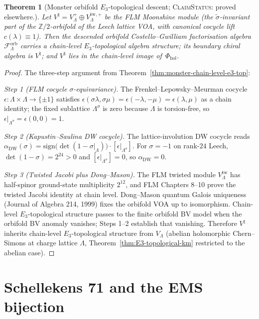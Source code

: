\documentclass[11pt]{amsart}
\newtheorem{theorem}{Theorem}[section]
\theoremstyle{definition}
\theoremstyle{remark}
\providecommand{\Z}{\mathbb{Z}}
\providecommand{\cF}{\mathcal{F}}
\providecommand{\ClaimStatusProvedElsewhere}{\textsc{ClaimStatus}: proved elsewhere.}
\begin{document}
\begin{theorem}[Monster orbifold $E_3$-topological descent; \ClaimStatusProvedElsewhere]
\label{thm:monster-e3-standalone}
Let $V^\natural = V_\Lambda^+ \oplus V_\Lambda^{\mathrm{tw},+}$ be
the FLM Moonshine module (the $\widetilde\sigma$-invariant part of
the $\Z/2$-orbifold of the Leech lattice VOA, with canonical cocycle
lift $c(\lambda) \equiv 1$). Then the descended orbifold
Costello--Gwilliam factorisation algebra $\cF_\Lambda^{\mathrm{orb}}$
carries a chain-level $E_3$-topological algebra structure; its boundary
chiral algebra is $V^\natural$; and $V^\natural$ lies in the
chain-level image of~$\Phi_{\mathrm{hol}}$.
\end{theorem}

\begin{proof}
The three-step argument from
Theorem~\ref*{thm:monster-chain-level-e3-top}:

\emph{Step 1 (FLM cocycle $\sigma$-equivariance).} The Frenkel--Lepowsky--Meurman
cocycle $\epsilon\colon \Lambda \times \Lambda \to \{\pm 1\}$ satisfies
$\epsilon(\sigma\lambda, \sigma\mu) = \epsilon(-\lambda, -\mu) =
\epsilon(\lambda, \mu)$ as a chain identity; the fixed sublattice
$\Lambda^\sigma$ is zero because $\Lambda$ is torsion-free, so
$\epsilon|_{\Lambda^\sigma} = \epsilon(0, 0) = 1$.

\emph{Step 2 (Kapustin--Saulina DW cocycle).} The lattice-involution
DW cocycle reads
$\alpha_{\mathrm{DW}}(\sigma) = \mathrm{sign}\bigl(\det(1 - \sigma|_\Lambda)\bigr)
\cdot [\epsilon|_{\Lambda^\sigma}]$. For $\sigma = -1$ on rank-$24$
Leech, $\det(1 - \sigma) = 2^{24} > 0$ and
$[\epsilon|_{\Lambda^\sigma}] = 0$, so $\alpha_{\mathrm{DW}} = 0$.

\emph{Step 3 (Twisted Jacobi plus Dong--Mason).} The FLM twisted
module $V_\Lambda^{\mathrm{tw}}$ has half-spinor ground-state
multiplicity $2^{12}$, and FLM Chapters 8--10 prove the twisted
Jacobi identity at chain level. Dong--Mason quantum Galois uniqueness
(Journal of Algebra 214, 1999) fixes the orbifold VOA up to
isomorphism. Chain-level $E_3$-topological structure passes to the
finite orbifold BV model when the orbifold BV anomaly vanishes; Steps
1--2 establish that vanishing.
Therefore $V^\natural$ inherits chain-level $E_3$-topological
structure from $V_\Lambda$ (abelian holomorphic Chern--Simons at
charge lattice $\Lambda$, Theorem~\ref*{thm:E3-topological-km}
restricted to the abelian case).
\end{proof}

\section{Schellekens 71 and the EMS bijection}
\end{document}
